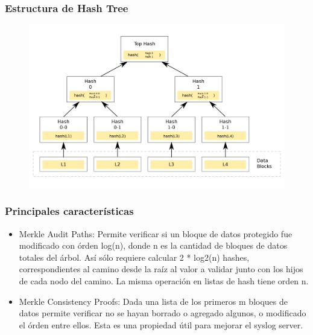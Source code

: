 \documentclass[10pt, a4paper,english,spanish]{beamer}
\begin{document}
\begin{frame}
\frametitle{Estructura de Hash Tree}

\begin{figure}
  \includegraphics[width=\linewidth]{imagenes/hash_tree.png}
\end{figure}

\end{frame}


\begin{frame}
\frametitle{Principales caracter\'isticas}

\begin{itemize}

\item Merkle Audit Paths: Permite verificar si un bloque de datos protegido fue modificado con \'orden log(n), donde n es la cantidad de bloques de datos totales del \'arbol. As\'i s\'olo requiere calcular 2 * log2(n) hashes, correspondientes al camino desde la ra\'iz al valor a validar junto con los hijos de cada nodo del camino. La misma operaci\'on en listas de hash tiene orden n.

\item Merkle Consistency Proofs: Dada una lista de los primeros m bloques de datos permite verificar no se hayan borrado o agregado algunos, o modificado el \'orden entre ellos. Esta es una propiedad \'util para mejorar el syslog server.

\end{itemize}

\end{frame}
\end{document}
